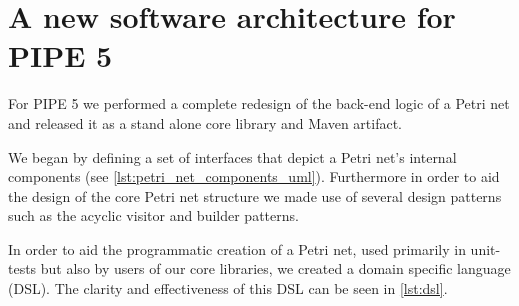 \section{A new software architecture for PIPE 5}
For PIPE 5 we performed a complete redesign of the back-end logic of a Petri net and released it as a stand alone core library and Maven artifact. 

We began by defining a set of interfaces that depict a Petri net's internal components (see \cref{lst:petri_net_components_uml}).  Furthermore in order to aid the design of the core Petri net structure we made use of several design patterns such as the acyclic visitor and builder patterns.


In order to aid the programmatic creation of a Petri net, used primarily in unit-tests but also by users of our core libraries, we created a domain specific language (DSL). The clarity and effectiveness of this DSL can be seen in \cref{lst:dsl}.

